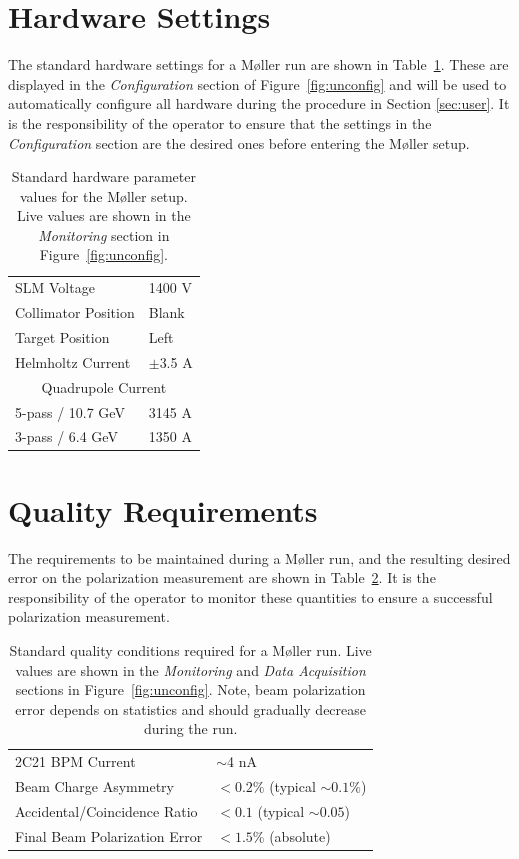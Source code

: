 \documentclass[amsmath,amssymb,notitlepage,12pt]{revtex4}
\begin{document}
\section{Hardware Settings}
The standard hardware settings for a M{\o}ller run are shown in Table~\ref{tab:pars}.  These are displayed in the {\em Configuration} section of Figure~\ref{fig:unconfig} and will be used to automatically configure all hardware during the procedure in Section \ref{sec:user}.  It is the responsibility of the operator to ensure that the settings in the {\em Configuration} section are the desired ones before entering the M{\o}ller setup.
\begin{table}[htbp]\centering
    \begin{tabular}{ll}\toprule[1.5pt]
        SLM Voltage & 1400 V \\
        Collimator Position & Blank \\
        Target Position & Left \\
        Helmholtz Current & $\pm$3.5 A \\
        \cmidrule[0.5pt]{1-2}
        \multicolumn{2}{c}{Quadrupole Current} \\
        5-pass / 10.7 GeV & 3145 A\\
        3-pass / 6.4 GeV & 1350 A\\
        \bottomrule[1.5pt]
    \end{tabular}
    \caption{Standard hardware parameter values for the M{\o}ller setup.  Live values are shown in the {\em Monitoring} section in Figure~\ref{fig:unconfig}.\label{tab:pars}}
\end{table}

\section{Quality Requirements}\label{sec:quality}
The requirements to be maintained during a M{\o}ller run, and the resulting desired error on the polarization measurement are shown in Table~\ref{tab:reqs}.  It is the responsibility of the operator to monitor these quantities to ensure a successful polarization measurement.
\begin{table}[htbp]\centering
    \begin{tabular}{ll}\toprule[1.5pt]
        2C21 BPM Current & $\sim$4 nA\\
        Beam Charge Asymmetry & $<0.2\%$ (typical $\sim 0.1\%$)\\
        Accidental/Coincidence Ratio & $<0.1$ (typical $\sim 0.05$)\\
        Final Beam Polarization Error & $<1.5\%$ (absolute)\\
        \bottomrule[1.5pt]
    \end{tabular}
    \caption{Standard quality conditions required for a M{\o}ller run.  Live values are shown in the {\em Monitoring} and {\em Data Acquisition} sections in Figure~\ref{fig:unconfig}.  Note, beam polarization error depends on statistics and should gradually decrease during the run.\label{tab:reqs}}
\end{table}
\end{document}
